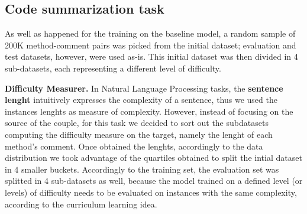 \subsection{Code summarization task}
As well as happened for the training on the baseline model, a random sample of 200K method-comment pairs was picked from the initial dataset;
evaluation and test datasets, however, were used as-is. This initial dataset was then divided in 4 sub-datasets, each representing a different
level of difficulty.
\newline




\noindent\textbf{Difficulty Measurer.} In Natural Language Processing tasks, the \textbf{sentence lenght} intuitively expresses the complexity 
of a sentence, thus we used the instances lenghts as measure of complexity. 
However, instead of focusing on the source of the couple, for this task we decided to sort out the subdatasets computing the
difficulty measure on the target, namely the lenght of each method's comment. 
Once obtained the lenghts, accordingly to the data distribution we took advantage of the quartiles obtained to split the intial dataset in 4 smaller 
buckets. 
Accordingly to the training set, the evaluation set was splitted in 4 sub-datasets as well, because the model trained on a defined level (or levels) of difficulty
needs to be evaluated on instances with the same complexity, according to the curriculum learning idea.\newline

